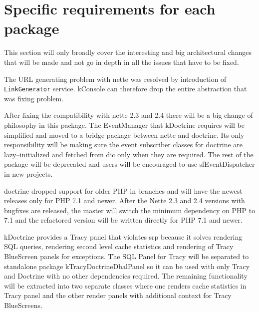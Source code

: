 \section{Specific requirements for each package} \label{sec:roadmap:each-package}

This section will only broadly cover the interesting and big architectural changes that will be made and not go in depth in all the issues that have to be fixed.


The URL generating problem with \gls{nette} was resolved by introduction of \lstinline{LinkGenerator} service. \gls{kConsole} can therefore drop the entire abstraction that was fixing problem.


After fixing the compatibility with \gls{nette} 2.3 and 2.4 there will be a big change of philosophy in this package. The EventManager that \gls{kDoctrine} requires will be simplified and moved to a bridge package between \gls{nette} and \gls{doctrine}. Its only responsibility will be making sure the event subscriber classes for \gls{doctrine} are lazy--initialized and fetched from \gls{dic} only when they are required. The rest of the package will be deprecated and users will be encouraged to use \gls{sfEventDispatcher} in new projects.




\gls{doctrine} dropped support for older PHP in  branches and will have the newest releases only for PHP 7.1 and newer. After the Nette 2.3 and 2.4 versions with bugfixes are released, the master will switch the minimum dependency on PHP to 7.1 and the refactored version will be written directly for PHP 7.1 and newer.

\gls{kDoctrine} provides a Tracy panel that violates \gls{srp} because it solves rendering SQL queries, rendering second level cache statistics and rendering of Tracy BlueScreen panels for exceptions. The SQL Panel for Tracy will be separated to standalone package \gls{kTracyDoctrineDbalPanel} so it can be used with only Tracy and Doctrine with no other dependencies required. The remaining functionality will be extracted into two separate classes where one renders cache statistics in Tracy panel and the other render panels with additional context for Tracy BlueScreens.

